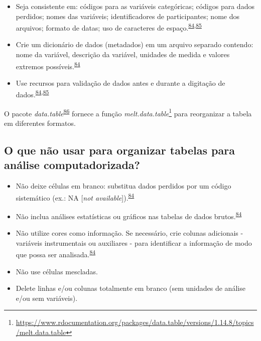 \documentclass[
  a4paper,
]{book}
\renewcommand{\href}[2]{#2\footnote{\url{#1}}}
\newenvironment{infobox}[1]
  {
  \begin{itemize}
  \renewcommand{\labelitemi}{
    \raisebox{-.7\height}[0pt][0pt]{
      {\setkeys{Gin}{width=3em,keepaspectratio}
        \texttt{[image: \#1]}}
    }
  }
  \setlength{\fboxsep}{1em}
  \begin{blackbox}
  \item
  }
  {
  \end{blackbox}
  \end{itemize}
  }
\begin{document}
\begin{itemize}
\item
  Seja consistente em: códigos para as variáveis categóricas; códigos para dados perdidos; nomes das variáveis; identificadores de participantes; nome dos arquivos; formato de datas; uso de caracteres de espaço.\textsuperscript{\protect\hyperlink{ref-broman2018}{84},\protect\hyperlink{ref-Juluru2015}{85}}
\item
  Crie um dicionário de dados (metadados) em um arquivo separado contendo: nome da variável, descrição da variável, unidades de medida e valores extremos possíveis.\textsuperscript{\protect\hyperlink{ref-broman2018}{84}}
\item
  Use recursos para validação de dados antes e durante a digitação de dados.\textsuperscript{\protect\hyperlink{ref-broman2018}{84},\protect\hyperlink{ref-Juluru2015}{85}}
\end{itemize}

\begin{infobox}{images/Rlogo}
O pacote \emph{data.table}\textsuperscript{\protect\hyperlink{ref-data.table}{86}} fornece a função \href{https://www.rdocumentation.org/packages/data.table/versions/1.14.8/topics/melt.data.table}{\emph{melt.data.table}} para reorganizar a tabela em diferentes formatos.

\end{infobox}

\hypertarget{o-que-nuxe3o-usar-para-organizar-tabelas-para-anuxe1lise-computadorizada}{%
\subsection{O que não usar para organizar tabelas para análise computadorizada?}\label{o-que-nuxe3o-usar-para-organizar-tabelas-para-anuxe1lise-computadorizada}}

\begin{itemize}
\item
  Não deixe células em branco: substitua dados perdidos por um código sistemático (ex.: NA {[}\emph{not available}{]}).\textsuperscript{\protect\hyperlink{ref-broman2018}{84}}
\item
  Não inclua análises estatísticas ou gráficos nas tabelas de dados brutos.\textsuperscript{\protect\hyperlink{ref-broman2018}{84}}
\item
  Não utilize cores como informação. Se necessário, crie colunas adicionais - variáveis instrumentais ou auxiliares - para identificar a informação de modo que possa ser analisada.\textsuperscript{\protect\hyperlink{ref-broman2018}{84}}
\item
  Não use células mescladas.
\item
  Delete linhas e/ou colunas totalmente em branco (sem unidades de análise e/ou sem variáveis).
\end{itemize}
\end{document}
